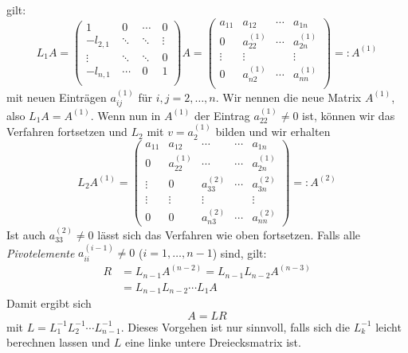\documentclass{mycourse}
\begin{document}
gilt:
\[
L_1 A =
\begin{pmatrix}
1 &\ 0 &\ \cdots &\ 0 \\ 
-l_{2,1} &\ \ddots &\ \ddots &\ \vdots \\
\vdots  &\ \ddots &\ \ddots &\ 0 \\
-l_{n,1} &\ \cdots &\ 0 &\ 1 \\
\end{pmatrix}
A
=
\begin{pmatrix}
a_{11} & a_{12} & \cdots & a_{1n}\\
0 & a_{22}^{(1)} & \cdots & a_{2n}^{(1)} \\
\vdots & \vdots &  & \vdots\\
0 & a_{n2}^{(1)} & \cdots & a_{nn}^{(1)}\\
\end{pmatrix}
=: A^{(1)}
\]
mit neuen Einträgen $a_{ij}^{(1)}$ für $i,j=2,\dotsc,n$.
Wir nennen die neue  Matrix $A^{(1)}$, also $L_1 A= A^{(1)}$.
Wenn nun in $A^{(1)}$ der Eintrag $a_{22}^{(1)}\neq 0$  ist, können  wir das
Verfahren fortsetzen und $L_2$ mit $v=a_2^{(1)}$ bilden und wir erhalten
\[
L_2A^{(1)} = \begin{pmatrix}
a_{11} &a_{12} &  \cdots  & \cdots & a_{1n}\\
0 & a_{22}^{(1)}&  \cdots & \cdots & a_{2n}^{(1)}\\
\vdots &  0 & a_{33}^{(2)} & \cdots & a_{3n}^{(2)} \\
\vdots & \vdots & \vdots  &  & \vdots \\
0 & 0 & a_{n3}^{(2)} &\cdots & a_{nn}^{(2)}
\end{pmatrix} =: A^{(2)}
\]
Ist auch $a_{33}^{(2)}\neq 0$  lässt sich das Verfahren wie oben fortsetzen.
Falls alle \emph{Pivotelemente} $a_{ii}^{(i-1)}\neq 0$ ($i=1,\dotsc,n-1$) sind, gilt:
\begin{align*}
R &=L_{n-1}A^{(n-2)} = L_{n-1}L_{n-2}A^{(n-3)}\\
&= L_{n-1}L_{n-2}\dotsb L_1A
\end{align*}
Damit ergibt sich
\[
A=LR
\]
mit $L=L_1^{-1}L_2^{-1}\dotsb L_{n-1}^{-1}$.
Dieses Vorgehen ist nur sinnvoll, falls sich die $L_k^{-1}$ leicht berechnen lassen und $L$ eine linke untere Dreiecksmatrix ist.
\end{document}
